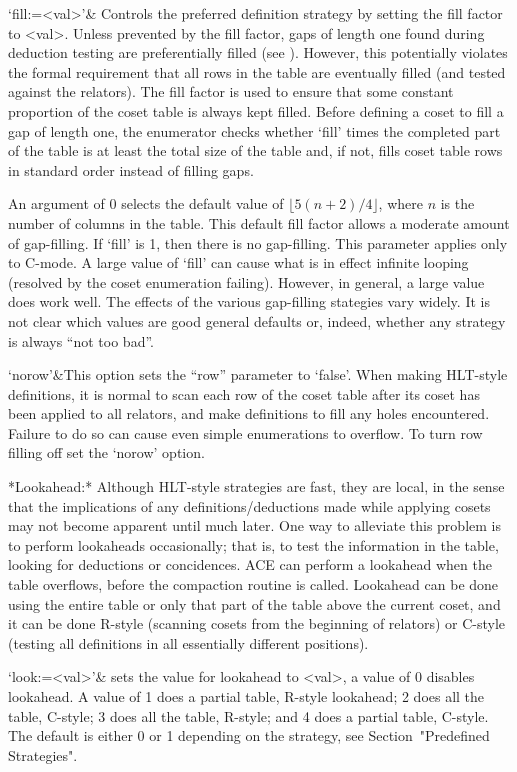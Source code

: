 `fill:=<val>'&
Controls the preferred definition strategy by setting the fill factor to
<val>. Unless prevented by the fill factor,
gaps of length one found during deduction testing are
preferentially filled (see \cite{Hav}).  However, this potentially violates
the formal requirement that all rows in the table are eventually filled (and
tested against the relators).  The fill factor is used to ensure that some
constant proportion of the coset table is always kept filled.  Before
defining a coset to fill a gap of length one, the enumerator checks whether
`fill' times the completed part of the table is at least the total size of
the table and, if not, fills coset table rows in standard order instead 
of filling gaps.

An argument of 0 selects the default value of $\lfloor 5(n+2)/4 \rfloor$,
where $n$ is the number of columns in the table.  
This default fill factor allows a moderate amount of gap-filling.
If `fill' is 1, then there is no gap-filling.
This parameter applies only to C-mode.
A large value of `fill' can cause what is in effect infinite looping
(resolved by the coset enumeration failing).
However, in general, a large value does work well.
The effects of the various gap-filling stategies vary widely.  
It is not clear which values are good general defaults or, indeed, whether
  any strategy is always ``not too bad''.

`norow'&This option sets the ``row'' parameter to `false'.
When making HLT-style definitions, it is normal to scan each row of the
  coset table after its coset has been applied to all relators, and make 
  definitions to fill any holes encountered.
Failure to do so can cause even simple enumerations to overflow.
To turn row filling off set the `norow' option.
\enditems

*Lookahead:*
Although HLT-style strategies are fast, they are local, in the
sense that the implications of any definitions/deductions made while
applying cosets may not become apparent until much later.  One way to
alleviate this problem is to perform lookaheads occasionally; that is, to
test the information in the table, looking for deductions or concidences.
ACE can perform a lookahead when the table overflows, before the compaction
routine is called.  Lookahead can be done using the entire table or only
that part of the table above the current coset, and it can be done R-style
(scanning cosets from the beginning of relators) or C-style (testing all
definitions in all essentially different positions).

\beginitems
`look:=<val>'&
sets the value for lookahead to <val>, a value of 0 disables
lookahead.
A value of 1 does a
partial table, R-style lookahead; 2 does all the table, C-style; 3 does all
the table, R-style; and 4 does a partial table, C-style.  The default is
either 0 or 1 depending on the strategy, see Section~"Predefined Strategies".
\enditems

